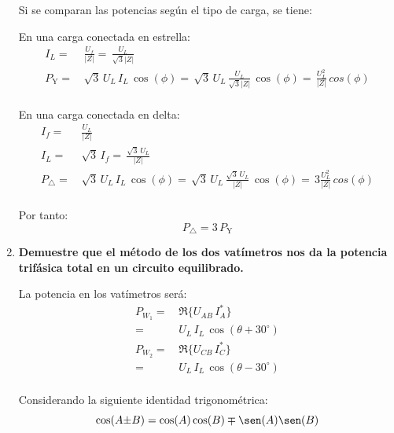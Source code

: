 \documentclass[letter,11pt]{article}
\begin{document}
\begin{enumerate}
Si se comparan las potencias según el tipo de carga, se tiene:

En una carga conectada en estrella:
\begin{equation*}
    \begin{split}
        I_L =\,& \frac{U_f}{|Z|}
            =\,  \frac{U_L}{\sqrt{3}|Z|}\\
        P_{\text{Y}} =\,& \sqrt{3}\,U_L\,I_L\,\cos(\phi)
                     =\,  \sqrt{3}\,U_L\,\frac{U_L}{\sqrt{3}|Z|}\,\cos(\phi)
                     =\,  \frac{U_L^2}{|Z|}\,cos(\phi)\\
    \end{split}
\end{equation*}

En una carga conectada en delta:
\begin{equation*}
    \begin{split}
        I_f =\,& \frac{U_L}{|Z|}\\
        I_L =\,& \sqrt{3}\,I_f
            =\,  \frac{\sqrt{3}\,U_L}{|Z|}\\
        P_{\triangle} =\,& \sqrt{3}\,U_L\,I_L\,\cos(\phi)
                      =\,  \sqrt{3}\,U_L\,\frac{\sqrt{3}\,U_L}{|Z|}\,\cos(\phi)
                      =\,  3\frac{U_L^2}{|Z|}\,cos(\phi)\\
    \end{split}
\end{equation*}

Por tanto:
\begin{equation*}
    P_{\triangle} = 3\,P_{\text{Y}}
\end{equation*}

\item \textbf{Demuestre que el método de los dos vatímetros nos da la potencia
trifásica total en un circuito equilibrado.}

La potencia en los vatímetros será:
\begin{equation*}
    \begin{split}
        P_{W_1} =\,& \Re\{U_{AB}\,I^{*}_A\}\\
                =\,& U_L\,I_L\,\cos(\theta + 30^{\circ})\\
        P_{W_2} =\,& \Re\{U_{CB}\,I^{*}_C\}\\
                =\,& U_L\,I_L\,\cos(\theta - 30^{\circ})\\
    \end{split}
\end{equation*}

Considerando la siguiente identidad trigonométrica:
\begin{equation*}
    \cos(A{\pm}B) = \cos(A)\cos(B) \mp \sen(A)\sen(B)
\end{equation*}


\end{enumerate}
\end{document}
